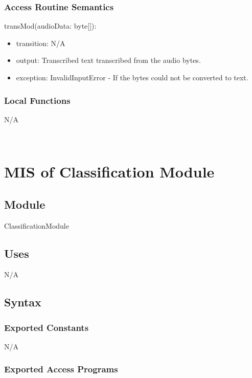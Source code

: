 \documentclass[12pt, titlepage]{article}
\begin{document}
\subsubsection{Access Routine Semantics}

\noindent transMod(audioData: byte[]): 
\begin{itemize}
  \item transition: N/A
  \item output: Transcribed text transcribed from the audio bytes. 
  \item exception: InvalidInputError - If the bytes could not be converted to text. 
\end{itemize}

\subsubsection{Local Functions}

N/A

\newpage
~\newpage
  
\section{MIS of Classification Module} \label{Classification_Module} 

\subsection{Module}

ClassificationModule

\subsection{Uses}

N/A

\subsection{Syntax}

\subsubsection{Exported Constants}

N/A

\subsubsection{Exported Access Programs}
\end{document}
